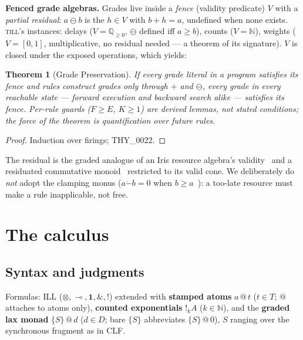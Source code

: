 \documentclass[11pt]{article}
\makeatletter
\newcommand{\lax}[2]{\{#1\}\mathbin{@}#2}       %
\newcommand{\gbang}[1]{{!}_{#1}}                 %
\newcommand{\res}{\mathbin{\ominus}}             %
\newcommand{\loli}{\multimap}                    %
\newcommand{\tensor}{\otimes}                    %
\newcommand{\addconj}{\mathbin{\&}}              %
\newcommand{\bang}{{!}}                          %
\newcommand{\QQ}{\mathbb{Q}}                     %
\newcommand{\NN}{\mathbb{N}}                     %
\newcommand{\stmp}[2]{#1\mathbin{@}#2}           %
\newcommand{\till}{\textsc{till}}                %
\newtheorem{theorem}{Theorem}[section]
\theoremstyle{definition}
\theoremstyle{remark}
\makeatother
\begin{document}
\medskip
\noindent\textbf{Fenced grade algebras.}  Grades live inside a \emph{fence}
(validity predicate) $V$ with a \emph{partial residual}: $a \res b$ is the
$h \in V$ with $b + h = a$, undefined when none exists.  \till{}'s instances:
delays ($V = \QQ_{\geq 0}$, $\res$ defined iff $a \geq b$), counts ($V = \NN$),
weights ($V = [0,1]$, multiplicative, no residual needed --- a theorem of its
signature).  $V$ is closed under the exposed operations, which yields:

\begin{theorem}[Grade Preservation]
\label{thm:grade-pres}
If every grade literal in a program satisfies its fence and rules construct
grades only through $+$ and $\res$, every grade in every reachable state ---
forward execution and backward search alike --- satisfies its fence.  Per-rule
guards ($F \geq E$, $K \geq 1$) are derived lemmas, not stated conditions; the
force of the theorem is quantification over \emph{future} rules.
\end{theorem}
\begin{proof}
Induction over firings; THY\_0022.
\end{proof}

The residual is the graded analogue of an Iris resource algebra's
validity~\cite{JungIris2018} and a residuated commutative
monoid~\cite{Galatos2007} restricted to its valid cone.  We deliberately do
\emph{not} adopt the clamping monus ($a \mathbin{\dot{-}} b = 0$ when
$b \geq a$~\cite{Amer1984}): a too-late resource must make a rule inapplicable,
not free.

\section{The calculus}
\label{sec:calculus}

\subsection{Syntax and judgments}

Formulas: ILL ($\tensor, \loli, \mathbf{1}, \addconj, \bang$) extended with
\textbf{stamped atoms} $\stmp{a}{t}$ ($t \in T$; $@$ attaches to atoms only),
\textbf{counted exponentials} $\gbang{k} A$ ($k \in \NN$), and the
\textbf{graded lax monad} $\lax{S}{d}$ ($d \in D$; bare $\{S\}$ abbreviates
$\lax{S}{0}$), $S$ ranging over the synchronous fragment as in CLF.
\end{document}
